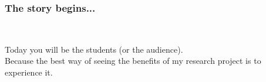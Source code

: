 \begin{frame}
  \frametitle{The story begins... }
  \begin{module}[id=storyBegin]
    \\
    \begin{center}
      Today you will be the students (or the audience).\\
      \vspace{1cm}
      Because the best way of seeing the benefits of my research project is to experience it.
      \vspace{1cm}
    \end{center}
  \end{module}
\end{frame}

